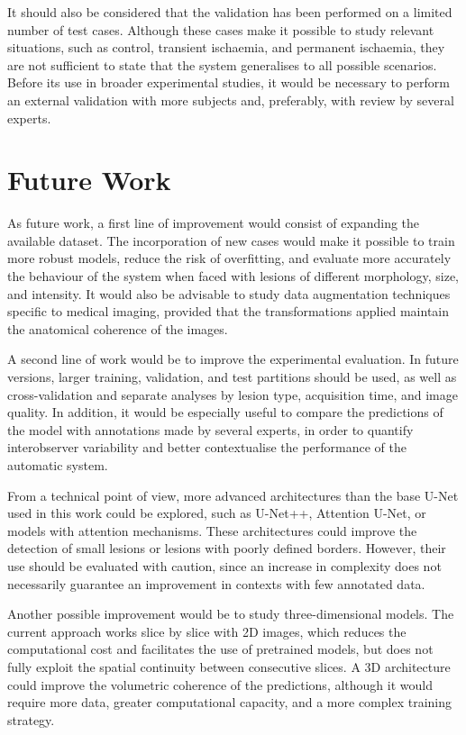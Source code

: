 It should also be considered that the validation has been performed on a limited number of test cases. Although these cases make it possible to study relevant situations, such as 
control, transient ischaemia, and permanent ischaemia, they are not sufficient to state that the system generalises to all possible scenarios. Before its use in broader 
experimental studies, it would be necessary to perform an external validation with more subjects and, preferably, with review by several experts.

\section*{Future Work}

As future work, a first line of improvement would consist of expanding the available dataset. The incorporation of new cases would make it possible to train more 
robust models, reduce the risk of overfitting, and evaluate more accurately the behaviour of the system when faced with lesions of different morphology, size, and intensity. It would also 
be advisable to study data augmentation techniques specific to medical imaging, provided that the transformations applied maintain the anatomical coherence of the images.

A second line of work would be to improve the experimental evaluation. In future versions, larger training, validation, and test partitions should be used, 
as well as cross-validation and separate analyses by lesion type, acquisition time, and image quality. In addition, it would be especially useful to compare the predictions of the 
model with annotations made by several experts, in order to quantify interobserver variability and better contextualise the performance of the automatic system.

From a technical point of view, more advanced architectures than the base U-Net used in this work could be explored, such as U-Net++, Attention U-Net, or models with 
attention mechanisms. These architectures could improve the detection of small lesions or lesions with poorly defined borders. However, their use should be evaluated with caution, 
since an increase in complexity does not necessarily guarantee an improvement in contexts with few annotated data.

Another possible improvement would be to study three-dimensional models. The current approach works slice by slice with 2D images, which reduces the computational cost and facilitates the use 
of pretrained models, but does not fully exploit the spatial continuity between consecutive slices. A 3D architecture could improve the volumetric coherence of 
the predictions, although it would require more data, greater computational capacity, and a more complex training strategy.

